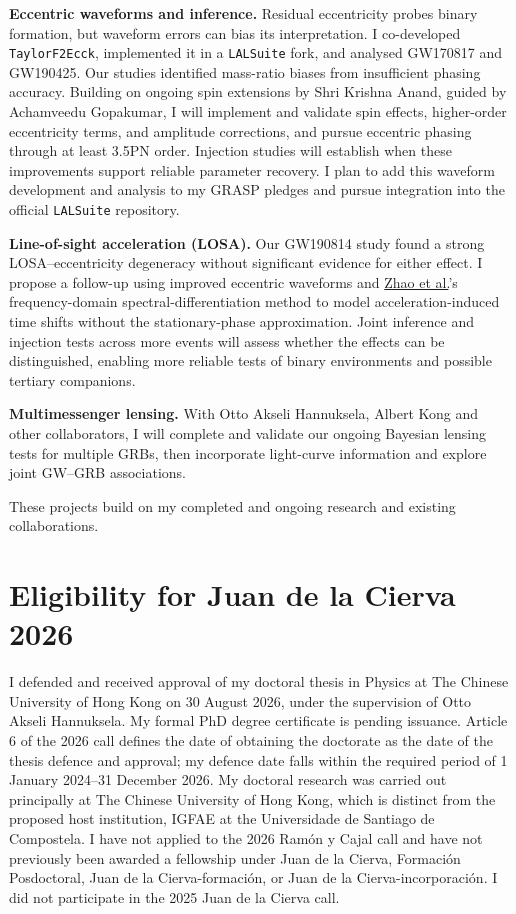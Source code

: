 \documentclass[11pt,a4paper]{article}
\begin{document}
\textbf{Eccentric waveforms and inference.}
Residual eccentricity probes binary formation, but waveform errors can bias its interpretation. I co-developed \texttt{TaylorF2Ecck}, implemented it in a \texttt{LALSuite} fork, and analysed GW170817 and GW190425. Our studies identified mass-ratio biases from insufficient phasing accuracy. Building on ongoing spin extensions by Shri Krishna Anand, guided by Achamveedu Gopakumar, I will implement and validate spin effects, higher-order eccentricity terms, and amplitude corrections, and pursue eccentric phasing through at least 3.5PN order. Injection studies will establish when these improvements support reliable parameter recovery. I plan to add this waveform development and analysis to my GRASP pledges and pursue integration into the official \texttt{LALSuite} repository.

\textbf{Line-of-sight acceleration (LOSA).}
Our GW190814 study found a strong LOSA--eccentricity degeneracy without significant evidence for either effect. I propose a follow-up using improved eccentric waveforms and \href{https://doi.org/10.1103/swkb-nkgg}{Zhao et al.}'s frequency-domain spectral-differentiation method to model acceleration-induced time shifts without the stationary-phase approximation. Joint inference and injection tests across more events will assess whether the effects can be distinguished, enabling more reliable tests of binary environments and possible tertiary companions.

\textbf{Multimessenger lensing.}
With Otto Akseli Hannuksela, Albert Kong and other collaborators, I will complete and validate our ongoing Bayesian lensing tests for multiple GRBs, then incorporate light-curve information and explore joint GW--GRB associations.

These projects build on my completed and ongoing research and existing collaborations.

\section*{Eligibility for Juan de la Cierva 2026}
I defended and received approval of my doctoral thesis in Physics at The Chinese University of Hong Kong on 30 August 2026, under the supervision of Otto Akseli Hannuksela. My formal PhD degree certificate is pending issuance. Article 6 of the 2026 call defines the date of obtaining the doctorate as the date of the thesis defence and approval; my defence date falls within the required period of 1 January 2024--31 December 2026. My doctoral research was carried out principally at The Chinese University of Hong Kong, which is distinct from the proposed host institution, IGFAE at the Universidade de Santiago de Compostela. I have not applied to the 2026 Ram\'{o}n y Cajal call and have not previously been awarded a fellowship under Juan de la Cierva, Formaci\'{o}n Posdoctoral, Juan de la Cierva-formaci\'{o}n, or Juan de la Cierva-incorporaci\'{o}n. I did not participate in the 2025 Juan de la Cierva call.
\end{document}
